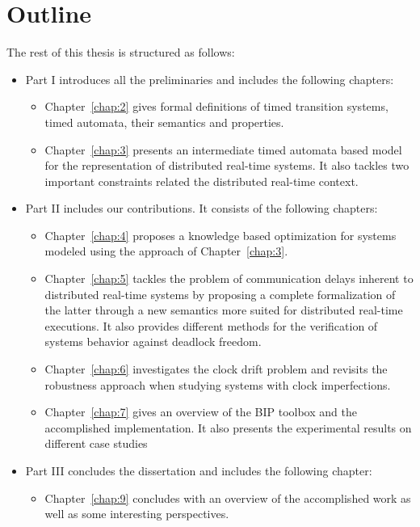 \section{Outline}
The rest of this thesis is structured as follows:
\begin{itemize}
  \item Part I introduces all the preliminaries and includes the following chapters:
    \begin{itemize}
      \item Chapter~\ref{chap:2} gives formal definitions of timed transition systems,
        timed automata, their semantics and properties.
      \item Chapter~\ref{chap:3} presents an intermediate timed automata based model for 
        the representation of distributed real-time systems. It also tackles two important
        constraints related the distributed real-time context.
    \end{itemize}
  \item Part II includes our contributions. It consists of the following chapters:
    \begin{itemize}
      \item Chapter~\ref{chap:4} proposes a knowledge based optimization for systems modeled
        using the approach of Chapter~\ref{chap:3}.
      \item Chapter~\ref{chap:5} tackles the problem of communication delays inherent to
        distributed real-time systems by proposing a complete formalization of the latter through
        a new semantics more suited for distributed real-time executions. 
        It also provides different methods for the verification of systems behavior against 
        deadlock freedom.
      \item Chapter~\ref{chap:6} investigates the clock drift problem and revisits the robustness
        approach when studying systems with clock imperfections.    
      \item Chapter~\ref{chap:7} gives an overview of the BIP toolbox and the accomplished 
        implementation. It also presents the experimental results on different case studies
    \end{itemize}
  \item Part III concludes the dissertation and includes the following chapter:
    \begin{itemize}
      \item Chapter~\ref{chap:9} concludes with an overview of the accomplished work as well as 
        some interesting perspectives.
    \end{itemize}
\end{itemize}

